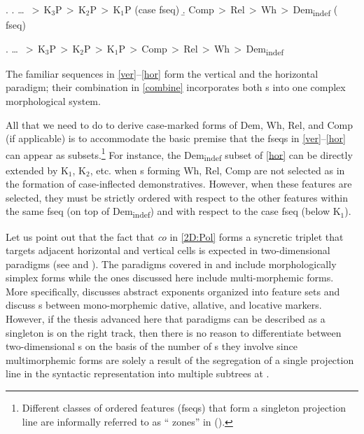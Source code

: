 \ex.\label{bothsequences} 
\a.\label{ver} \ldots \ $>$\,K$_{3}$P\,$>$\,K$_{2}$P\,$>$\,K$_{1}$P \hfill (case fseq) 
\b.\label{hor} Comp\,$>$\,Rel\,$>$\,Wh\,$>$\,Dem\textsubscript{indef}  \hfill ( fseq)

\ex.\label{combine} \ldots \ $>$\,K$_{3}$P\,$>$\,K$_{2}$P\,$>$\,K$_{1}$P\,$>$\,Comp\,$>$\,Rel\,$>$\,Wh\,$>$\,Dem\textsubscript{indef}

 The familiar sequences in \ref{ver}--\ref{hor} form the vertical and the horizontal paradigm; their combination in \ref{combine} incorporates both s into one complex morphological system.
 \par
 All that we need to do to derive case-marked forms of Dem, Wh, Rel, and Comp (if applicable) is to accommodate the basic premise that the fseqs in \ref{ver}--\ref{hor} can appear as subsets.\footnote{Different classes of ordered features (fseqs) that form a singleton projection line are informally referred to as `` zones'' in \citeauthor{LTN} (\citeyear{LTN,NU}). 
} %
For instance, the Dem\textsubscript{indef} subset of \ref{hor} can be directly extended by K$_{1}$, K$_{2}$, etc. when s forming Wh, Rel, Comp are not selected as in the formation of case-inflected demonstratives. However, when these features are selected, they must be strictly ordered with respect to the other features within  the same fseq (on top of Dem\textsubscript{indef}) and with respect to the case fseq (below K$_{1}$).
\par
Let us point out that the fact that \textit{co} in \ref{2D:Pol} forms a syncretic triplet that targets adjacent horizontal and vertical cells is expected in two-dimensional paradigms (see \citealt{TaraldsenNELS} and \citealt{CahaPantcheva2012}). The paradigms covered in \cite{TaraldsenNELS} and \cite{CahaPantcheva2012} include morphologically simplex forms while the ones discussed here include multi-morphemic forms. More specifically, \cite{TaraldsenNELS} discusses abstract exponents organized into feature sets and \cite{CahaPantcheva2012} discuss s between mono-morphemic dative, allative, and locative markers. However, if the thesis advanced here that paradigms can be described as a singleton  is on the right track, then there is no reason to differentiate between two-dimensional s on the basis of the number of s they involve since multimorphemic forms are solely a result of the segregation of a single  projection line in the syntactic representation into multiple subtrees at . 
